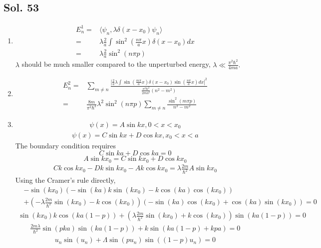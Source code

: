 \subsection*{Sol. 53}
\begin{enumerate}
    \item 
    \begin{align*}
        E^1_n=&\langle\psi_n, \lambda\delta(x-x_0)\psi_n\rangle\\
        =&\lambda\frac{2}{a}\int\sin^2(\frac{n\pi}{a}x)\delta(x-x_0)dx\\
        =&\lambda\frac{2}{a}
        \sin^2(n\pi p)
    \end{align*}
    $\lambda$ should be much smaller compared to the unperturbed energy, $\lambda\ll \frac{\pi^2\hbar^2}{4ma}.$
    \item 
    \begin{align*}
        E^2_n =& \sum_{m\neq n}
        \frac{|\frac{2}{a}\lambda\int\sin(\frac{m\pi}{a}x)\delta(x-x_0)\sin(\frac{n\pi}{a}x)dx|^2}{\frac{\pi^2\hbar^2}{2ma^2}(n^2-m^2)}\\
        =&\frac{8m}{\pi^2\hbar^2}\lambda^2
        \sin^2(n\pi p)
        \sum_{m\neq n}
        \frac{\sin^2(m\pi p)}{n^2-m^2}
    \end{align*}
    \item 
    \begin{align*}
        \psi(x)= A\sin kx , 0<x<x_0
    \end{align*}
    \begin{align*}
        \psi(x)= C\sin kx + D\cos kx, x_0<x<a
    \end{align*}
    The boundary condition requires
    $$
    C\sin ka + D\cos ka = 0
    $$
    $$
    A\sin kx_0 = C\sin kx_0 + D\cos kx_0
    $$
    \begin{align*}
        Ck\cos kx_0 -Dk\sin kx_0 - Ak\cos kx_0 = 
        \lambda\frac{2m}{\hbar^2}A\sin kx_0
    \end{align*}
    Using the Cramer's rule directly,
    \begin{align*}
        &-\sin (kx_0)(-\sin (ka) k\sin (kx_0)-k\cos(ka)\cos(kx_0))\\
        &+
        (-\lambda\frac{2m}{\hbar^2}\sin(kx_0)-k\cos(kx_0))
        (-\sin(ka)\cos(kx_0)+\cos(ka)\sin(k x_0))=0
    \end{align*}
    \begin{align*}
        \sin(kx_0)k\cos(ka(1-p))
        +(\lambda\frac{2m}{\hbar^2}\sin(kx_0)+k\cos(kx_0))\sin(ka(1-p))        =0
    \end{align*}
    \begin{align*}
        \frac{2m\lambda}{\hbar^2}\sin(pka)
        \sin(ka(1-p))
        +k\sin(ka(1-p)+kpa)=0
    \end{align*}
    \begin{align*}
        u_n\sin(u_n)+\Lambda\sin(pu_n)\sin((1-p)u_n)=0
    \end{align*}


\end{enumerate}
